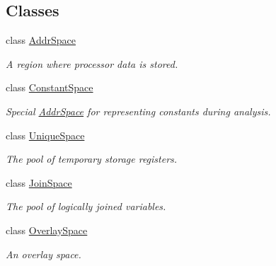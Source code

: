 \subsection*{Classes}
\begin{DoxyCompactItemize}
\item 
class \mbox{\hyperlink{class_addr_space}{Addr\+Space}}
\begin{DoxyCompactList}\small\item\em A region where processor data is stored. \end{DoxyCompactList}\item 
class \mbox{\hyperlink{class_constant_space}{Constant\+Space}}
\begin{DoxyCompactList}\small\item\em Special \mbox{\hyperlink{class_addr_space}{Addr\+Space}} for representing constants during analysis. \end{DoxyCompactList}\item 
class \mbox{\hyperlink{class_unique_space}{Unique\+Space}}
\begin{DoxyCompactList}\small\item\em The pool of temporary storage registers. \end{DoxyCompactList}\item 
class \mbox{\hyperlink{class_join_space}{Join\+Space}}
\begin{DoxyCompactList}\small\item\em The pool of logically joined variables. \end{DoxyCompactList}\item 
class \mbox{\hyperlink{class_overlay_space}{Overlay\+Space}}
\begin{DoxyCompactList}\small\item\em An overlay space. \end{DoxyCompactList}\end{DoxyCompactItemize}
